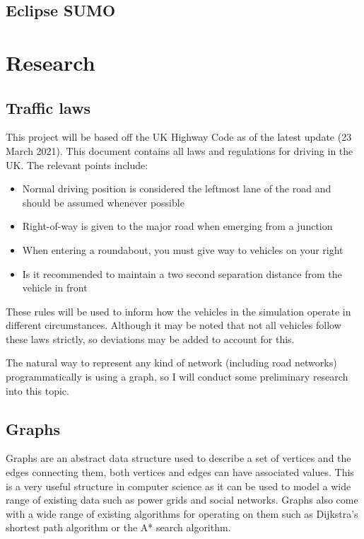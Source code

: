     \subsection{Eclipse SUMO}

\section{Research}

    \subsection{Traffic laws}

        This project will be based off the UK Highway Code \cite{Highway-Code} as of the latest update (23 March 2021). This document contains all laws and regulations for driving in the UK. The relevant points include:

        \begin{itemize}
            \item Normal driving position is considered the leftmost lane of the road and should be assumed whenever possible
            \item Right-of-way is given to the major road when emerging from a junction
            \item When entering a roundabout, you must give way to vehicles on your right
            \item Is it recommended to maintain a two second separation distance from the vehicle in front
        \end{itemize}

        These rules will be used to inform how the vehicles in the simulation operate in different circumstances. Although it may be noted that not all vehicles follow these laws strictly, so deviations may be added to account for this.

        The natural way to represent any kind of network (including road networks) programmatically is using a graph, so I will conduct some preliminary research into this topic.

    \subsection{Graphs}

        Graphs are an abstract data structure used to describe a set of vertices and the edges connecting them, both vertices and edges can have associated values. This is a very useful structure in computer science as it can be used to model a wide range of existing data such as power grids and social networks. Graphs also come with a wide range of existing algorithms for operating on them such as Dijkstra's shortest path algorithm or the A* search algorithm.

